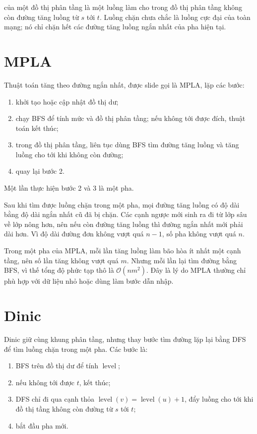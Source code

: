 \documentclass[11pt]{article}
\newcommand{\Oh}{\mathcal{O}}
\newcommand{\level}{\operatorname{level}}
\begin{document}
 của một đồ thị phân tầng là một luồng làm cho trong đồ thị
phân tầng không còn đường tăng luồng từ \(s\) tới \(t\). Luồng chặn chưa chắc
là luồng cực đại của toàn mạng; nó chỉ chặn hết các đường tăng luồng ngắn
nhất của pha hiện tại.

\section{MPLA}

Thuật toán tăng theo đường ngắn nhất, được slide gọi là MPLA, lặp các bước:
\begin{enumerate}
  \item khởi tạo hoặc cập nhật đồ thị dư;
  \item chạy BFS để tính mức và đồ thị phân tầng; nếu không tới được đích,
  thuật toán kết thúc;
  \item trong đồ thị phân tầng, liên tục dùng BFS tìm đường tăng luồng và
  tăng luồng cho tới khi không còn đường;
  \item quay lại bước 2.
\end{enumerate}
Một lần thực hiện bước 2 và 3 là một pha.

Sau khi tìm được luồng chặn trong một pha, mọi đường tăng luồng có độ dài
bằng độ dài ngắn nhất cũ đã bị chặn. Các cạnh ngược mới sinh ra đi từ lớp sâu
về lớp nông hơn, nên nếu còn đường tăng luồng thì đường ngắn nhất mới phải
dài hơn. Vì độ dài đường đơn không vượt quá \(n-1\), số pha không vượt quá
\(n\).

Trong một pha của MPLA, mỗi lần tăng luồng làm bão hòa ít nhất một cạnh tầng,
nên số lần tăng không vượt quá \(m\). Nhưng mỗi lần lại tìm đường bằng BFS,
vì thế tổng độ phức tạp thô là \(\Oh(nm^2)\). Đây là lý do MPLA thường chỉ
phù hợp với dữ liệu nhỏ hoặc dùng làm bước dẫn nhập.

\section{Dinic}

Dinic giữ cùng khung phân tầng, nhưng thay bước tìm đường lặp lại bằng DFS để
tìm luồng chặn trong một pha. Các bước là:
\begin{enumerate}
  \item BFS trên đồ thị dư để tính \(\level\);
  \item nếu không tới được \(t\), kết thúc;
  \item DFS chỉ đi qua cạnh thỏa \(\level(v)=\level(u)+1\), đẩy luồng cho
  tới khi đồ thị tầng không còn đường từ \(s\) tới \(t\);
  \item bắt đầu pha mới.
\end{enumerate}
\end{document}
